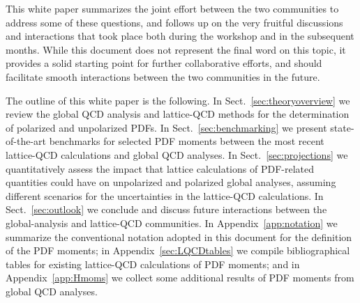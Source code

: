 This white paper summarizes the joint effort between the two communities to 
address some of these questions, and follows up on the very fruitful 
discussions and interactions that took place both during 
the workshop and in the subsequent months.
%
While this document does not represent the final word on this topic, it 
provides a solid starting point for further collaborative efforts, and 
should facilitate smooth interactions between the two communities in the future.

The outline of this white paper is the following.
%
In Sect.~\ref{sec:theoryoverview} we review the global QCD analysis and 
lattice-QCD methods for the determination of polarized and unpolarized PDFs.
%
In Sect.~\ref{sec:benchmarking} we present state-of-the-art benchmarks 
for selected PDF moments between the most recent lattice-QCD calculations and 
global QCD analyses.
%
In Sect.~\ref{sec:projections} we quantitatively assess the impact that
lattice calculations of PDF-related quantities could have on unpolarized
and polarized global analyses, assuming different scenarios for the 
uncertainties in the lattice-QCD calculations.
%
In Sect.~\ref{sec:outlook} we conclude
and discuss future interactions between
the global-analysis and lattice-QCD communities.
%
In Appendix~\ref{app:notation} we summarize the conventional notation
adopted in this document for the definition of the PDF moments; 
in Appendix~\ref{sec:LQCDtables} we compile bibliographical tables for
existing lattice-QCD calculations of PDF moments;
and in Appendix~\ref{app:Hmoms} we collect some
additional results of PDF moments from global QCD analyses.

